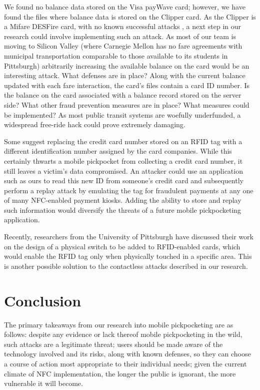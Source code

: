 \documentclass{IEEEtran}
\begin{document}
We found no balance data stored on the Visa payWave card; however, we have found the files where balance data is stored on the Clipper card.  As the Clipper is a Mifare DESFire card, with no known successful attacks \cite{farebot-1}, a next step in our research could involve implementing such an attack.  As most of our team is moving to Silicon Valley (where Carnegie Mellon has no fare agreements with municipal transportation comparable to those available to its students in Pittsburgh) arbitrarily increasing the available balance on the card would be an interesting attack.  What defenses are in place?  Along with the current balance updated with each fare interaction, the card's files contain a card ID number.  Is the balance on the card associated with a balance record stored on the server side?  What other fraud prevention measures are in place?  What measures could be implemented?  As most public transit systems are woefully underfunded, a widespread free-ride hack could prove extremely damaging.

Some suggest replacing the credit card number stored on an RFID tag with a different identification number assigned by the card companies. While this certainly thwarts a mobile pickpocket from collecting a credit card number, it still leaves a victim's data compromised. An attacker could use an application such as ours to read this new ID from someone's credit card and subsequently perform a replay attack by emulating the tag for fraudulent payments at any one of many NFC-enabled payment kiosks.  Adding the ability to store and replay such information would diversify the threats of a future mobile pickpocketing application.  

Recently, researchers from the University of Pittsburgh have discussed their work on the design of a physical switch to be added to RFID-enabled cards, which would enable the RFID tag only when physically touched in a specific area. This is another possible solution to the contactless attacks described in our research. \cite{upitt-rfid-switch}

\section{Conclusion}
The primary takeaways from our research into mobile pickpocketing are as follows:  despite any evidence or lack thereof mobile pickpocketing in the wild, such attacks are a legitimate threat; users should be made aware of the technology involved and its risks, along with known defenses, so they can choose a course of action most appropriate to their individual needs; given the current climate of NFC implementation, the longer the public is ignorant, the more vulnerable it will become.
\end{document}
